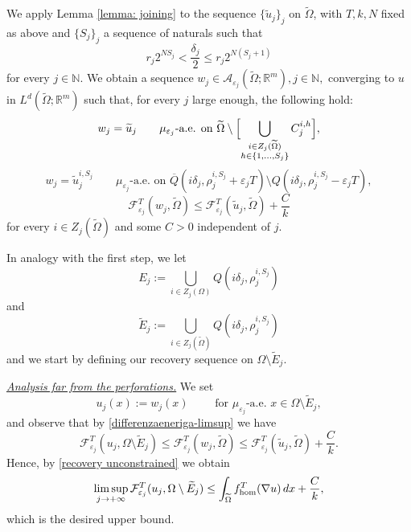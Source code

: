 \documentclass{article}
\theoremstyle{plain}
\theoremstyle{definition}
\def\NN{{\mathbb N}}
\newcommand{\ej}{\varepsilon_j}
\newcommand{\rj}{r_j}
\newcommand{\dej}{\delta_j}
\newcommand{\F}{\mathcal{F}}
\newcommand{\Q}
{\overline{Q}}
\numberwithin{equation}{section}
\begin{document}
We apply Lemma \ref{lemma: joining} to the sequence $\{\widetilde{u}_j\}_j$ on $\widetilde{\Omega}$, with $T,k,N$ fixed as above and $\{S_j\}_j$ a sequence of naturals such that
\begin{equation}\label{scelta Sj limsup}
    \rj2^{NS_j}< \frac{\dej}{2}\leq \rj2^{N(S_j+1)}
\end{equation}
for every $j\in\NN$. We obtain a sequence $w_{j}\in \mathcal{A}_{\varepsilon_{j}}(\widetilde{\Omega};\mathbb{R}^{m}), j\in\NN,$ converging to $u$ in $L^{d}(\widetilde{\Omega};\mathbb{R}^{m})$ such that, for every $j$ large enough, the following hold:
\begin{equation*}
    w_{j}=\widetilde{u}_{j}  \qquad \mu_{\ej} \text{-a.e. on } \widetilde{\Omega} \setminus \Bigl[ \bigcup_{\substack{i \in Z_{j}(\widetilde{\Omega}) \\ h\in\{1,\dots, S_j\}}}C_{j}^{i, h}\Bigr],
\end{equation*}
\begin{equation}\label{bordointerno-limsup}
    w_{j}=\widetilde{u}_{j}^{i, S_j}  \qquad \mu_{\ej} \text{-a.e. on } \Q(i\delta_j,\rho^{i,S_j}_{j}+\varepsilon_j T)\setminus Q(i\delta_j,\rho^{i, S_j}_{j}-\varepsilon_j T),
\end{equation}
\begin{equation}\label{differenzaeneriga-limsup}
    \F_{\ej}^T(w_j,\widetilde{\Omega})\leq \F_{\ej}^T(\widetilde{u}_j,\widetilde{\Omega})+\frac{C}{k}
\end{equation}
for every $i\in Z_j(\widetilde{\Omega})$ and some $C>0$ independent of $j$.

In analogy with the first step, we let
\begin{equation*}
    E_j:=\bigcup_{i\in Z_j(\Omega)} Q(i\dej, \rho_j^{i, S_j})
\end{equation*}
and
\begin{equation*}
    \widetilde{E}_j:=\bigcup_{i\in Z_j(\widetilde{\Omega})} Q(i\dej, \rho_j^{i, S_j})
\end{equation*}
and we start by defining our recovery sequence on $\Omega\setminus \widetilde{E}_j$.

\smallskip

\underline{{\it Analysis far from the perforations.}} We set
\begin{equation*}
    u_j(x):=w_j(x) \qquad \text{ for }\mu_{\ej} \text{-a.e. } x\in\Omega\setminus \widetilde{E}_j,
\end{equation*}
and observe that by \eqref{differenzaeneriga-limsup} we have
\begin{equation*}
    \F^T_{\ej}(u_j, \Omega\setminus \widetilde{E}_j )\leq\F^T_{\ej}(w_j, \widetilde{\Omega}) \leq \F_{\ej}^T(\widetilde{u}_j, \widetilde{\Omega})+\frac{C}{k}.
\end{equation*}
Hence, by \eqref{recovery unconstrained} we obtain
\begin{equation}\label{claim limsup stima fuori}
\limsup_{j\to+\infty}  \F^T_{\ej}(u_j, \Omega\setminus \widetilde{E}_j) \leq \int_{\widetilde{\Omega}} f^T_{\rm hom}(\nabla u)\,dx + \frac{C}{k},
\end{equation}
which is the desired upper bound.
\end{document}
